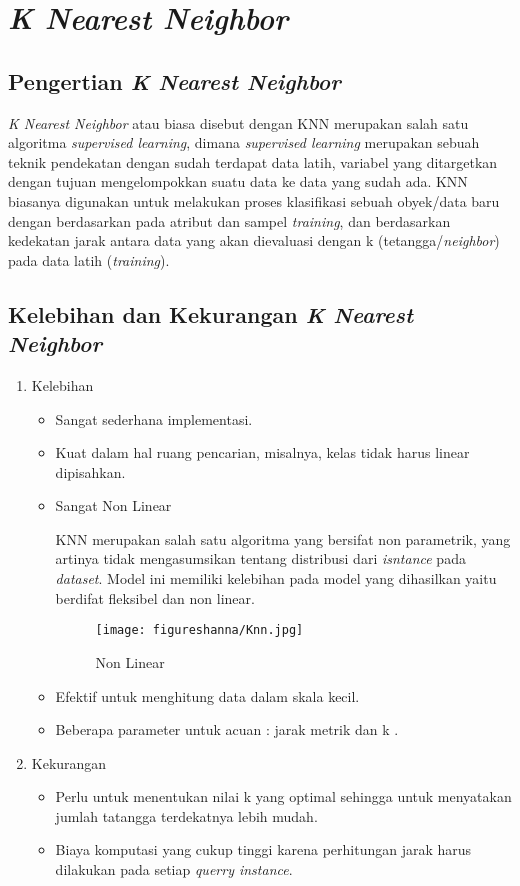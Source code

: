 \pagebreak
\section{\textit{K Nearest Neighbor}}
\subsection{Pengertian \textit{K Nearest Neighbor}}
\textit{K Nearest Neighbor} atau biasa disebut dengan KNN merupakan salah satu algoritma \textit{supervised learning}, dimana \textit{supervised learning} merupakan sebuah teknik pendekatan dengan sudah terdapat data latih, variabel yang ditargetkan dengan tujuan mengelompokkan suatu data ke data yang sudah ada. KNN biasanya digunakan untuk melakukan proses klasifikasi sebuah obyek/data baru dengan berdasarkan pada atribut dan sampel \textit{training}, dan berdasarkan kedekatan jarak antara data yang akan dievaluasi dengan k (tetangga/\textit{neighbor}) pada data latih (\textit{training})\cite{hermaduanti2008sistem}.

\subsection{Kelebihan dan Kekurangan \textit{K Nearest Neighbor}}
\begin{enumerate}
    \item Kelebihan
\begin{itemize}
        \item Sangat sederhana implementasi.
        \item Kuat dalam hal ruang pencarian, misalnya, kelas tidak harus linear dipisahkan.
        \item Sangat Non Linear
        \par KNN merupakan salah satu algoritma yang bersifat non parametrik, yang artinya tidak mengasumsikan tentang distribusi dari \textit{isntance} pada \textit{dataset}. Model ini memiliki kelebihan pada model yang dihasilkan yaitu berdifat fleksibel dan non linear.
        \begin{figure}[!htpb]
        \centering
        \texttt{[image: figureshanna/Knn.jpg]}
        \caption{Non Linear
        \label{eq:31}}
        \end{figure} 
        \item Efektif untuk menghitung data dalam skala kecil.
        \item Beberapa parameter untuk acuan : jarak metrik dan k \cite{lestari2015penerapan}.
\end{itemize}
\item Kekurangan
    \begin{itemize}
        \item Perlu untuk menentukan nilai k yang optimal sehingga untuk menyatakan jumlah
tatangga terdekatnya lebih mudah.
        \item  Biaya komputasi yang cukup tinggi karena perhitungan jarak harus dilakukan pada setiap \textit{querry instance}\cite{afandie2014implementasi}.
    \end{itemize}
\end{enumerate}
